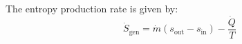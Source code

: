 The entropy production rate is given by:  
\[
\dot{S}_{\text{gen}} = \dot{m} (s_{\text{out}} - s_{\text{in}}) - \frac{\dot{Q}}{T}
\]